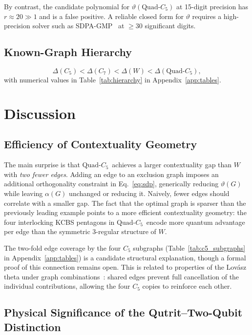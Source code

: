 \documentclass[aps,pra,twocolumn,superscriptaddress,longbibliography,floatfix]{revtex4-2}
\newcommand{\vt}{\vartheta}
\newcommand{\al}{\alpha}
\newcommand{\De}{\Delta}
\newcommand{\QC}{\ensuremath{\text{Quad-}C_5}}
\begin{document}
By contrast, the candidate polynomial for $\vt(\QC)$
at 15-digit precision has $r\approx20\gg1$ and is a false positive.
A reliable closed form for $\vt$ requires a high-precision solver such as
SDPA-GMP~\cite{Nakata2010} at $\geq30$ significant digits.

\subsection{Known-Graph Hierarchy}

\begin{equation}
  \De(C_5) < \De(C_7) < \De(W) < \De(\QC),
\end{equation}
with numerical values in Table~\ref{tab:hierarchy} in Appendix~\ref{app:tables}.

\section{Discussion}

\subsection{Efficiency of Contextuality Geometry}

The main surprise is that \QC\ achieves a larger contextuality
gap than $W$ with \emph{two fewer edges}.
Adding an edge to an exclusion graph imposes an additional orthogonality
constraint in Eq.~\eqref{eq:sdp}, generically reducing $\vt(G)$ while
leaving $\al(G)$ unchanged or reducing it.
Naively, fewer edges should correlate with a smaller gap.
The fact that the optimal graph is sparser than the previously leading example points
to a more efficient contextuality geometry: the four interlocking KCBS
pentagons in \QC\ encode more quantum advantage per edge than
the symmetric 3-regular structure of $W$.

The two-fold edge coverage by the four $C_5$ subgraphs
(Table~\ref{tab:c5_subgraphs} in Appendix~\ref{app:tables}) is a candidate structural explanation,
though a formal proof of this connection remains open.
This is related to properties of the Lov\'{a}sz theta under graph
combinations~\cite{Lovasz1979}: shared edges prevent full cancellation
of the individual contributions, allowing the four $C_5$ copies to
reinforce each other.

\subsection{Physical Significance of the Qutrit--Two-Qubit Distinction}
\end{document}
